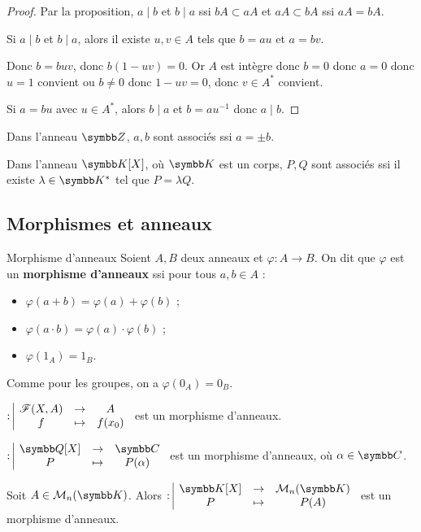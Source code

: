 \begin{proof}
    Par la proposition, $a \mid b$ et $b \mid a$ ssi $bA \subset aA$ et $aA \subset bA$ ssi 
    $aA = bA$.

    Si $a \mid b$ et $b \mid a$, alors il existe $u, v \in A$ tels que
    $b = au$ et $a = bv$. 

    Donc $b = buv$, donc $b(1 - uv) = 0$. Or $A$ est intègre donc 
    $b = 0$ donc $a = 0$ donc $u = 1$ convient ou $b \neq 0$ donc $1 - uv = 0$, donc $v \in A^*$ convient. 

    Si $a = bu$ avec $u \in A^*$, alors $b \mid a $ et $b = au^{-1}$ donc $a \mid b$.
\end{proof}

\begin{exemple}
    Dans l'anneau $\Z$, $a, b$ sont associés ssi $a = \pm b$.

    Dans l'anneau $\K[X]$, où $\K$ est un corps, $P, Q$ sont associés ssi
    il existe $\lambda \in \K^*$ tel que $P = \lambda Q$.
\end{exemple}

\subsection{Morphismes et anneaux}

\begin{definition}{Morphisme d'anneaux}{}
    Soient $A, B$ deux anneaux et $\varphi : A \to B$. On dit que $\varphi$ est un
    \textbf{morphisme d'anneaux} ssi pour tous $a, b \in A$ :
    \begin{itemize}
        \item $\varphi(a + b) = \varphi(a) + \varphi(b)$ ;
        \item $\varphi(a \cdot b) = \varphi(a) \cdot \varphi(b)$ ;
        \item $\varphi(1_A) = 1_B$.
    \end{itemize}
\end{definition}

\begin{remarque}
    Comme pour les groupes, on a $\varphi(0_A) = 0_B$.
\end{remarque}

\begin{exemple}
    $: \space \begin{array}{|ccc} \displaystyle \mathscr F(X, A) & \to & \displaystyle A \\ \displaystyle f & \mapsto & \displaystyle f(x_0) \end{array}$ est un morphisme d'anneaux. 

    \avspace 
    $\fonction {}{\Q [X]} \C P {P(\alpha)}$ est un morphisme d'anneaux, où $\alpha \in \C$.

    Soit $A \in \mathcal M_n(\K)$. Alors $\fonction {}{\K[X]}{\mathcal M_n(\K)} P {P(A)}$ est un morphisme d'anneaux.
\end{exemple}



